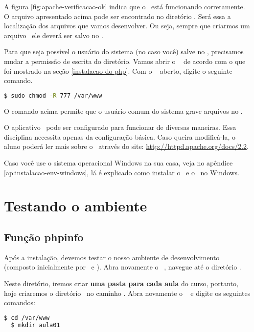 A figura \ref{fig:apache-verificacao-ok} indica que o \apache~está funcionando corretamente.
O arquivo apresentado acima pode ser encontrado no diretório \dirpadrao. Será 
essa a localização dos arquivos que vamos desenvolver. Ou seja, sempre que criarmos
um arquivo \phpextensao~ele deverá ser salvo no \dirpadrao. 

Para que seja possível o usuário do sistema (no caso você) salve no \dirpadrao,
precisamos mudar a permissão de escrita do diretório. Vamos abrir o \terminal~
de acordo com o que foi mostrado na seção \ref{instalacao-do-php}. Com o \terminal~
aberto, digite o seguinte comando.

\begin{lstlisting}[language=bash,style=codigos]
  $ sudo chmod -R 777 /var/www 
\end{lstlisting}

O comando acima permite que o usuário comum do sistema grave arquivos no \dirpadrao.

O aplicativo \apache~pode ser configurado para funcionar de diversas maneiras. 
Essa disciplina necessita apenas da configuração básica. Caso queira modificá-la, 
o aluno poderá ler mais sobre o \apache~através do site: \url{http://httpd.apache.org/docs/2.2}.

Caso você use o sistema operacional Windows na sua casa, veja no apêndice 
\ref{ap:instalacao-env-windows}, lá é explicado como instalar o \php~e o \apache~no Windows.


\section{Testando o ambiente}
\label{testando-ambiente}

\subsection{Função phpinfo}
\label{subsection:funcao-phpinfo}

Após a instalação, devemos testar o nosso ambiente de desenvolvimento (composto
inicialmente por \php~e \apache). Abra novamente o \terminal~, navegue até o
diretório \dirpadrao.

Neste diretório, iremos criar \textbf{uma pasta para cada aula} do curso, portanto, hoje
criaremos o diretório ~no caminho \dirpadrao. Abra novamente o \terminal~
e digite os seguintes comandos:

\begin{lstlisting}[language=bash,style=codigos]
  $ cd /var/www 
  $ mkdir aula01
\end{lstlisting}

